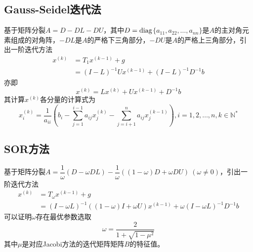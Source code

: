 \documentclass[UTF8,a4paper,10pt]{ctexart}
\begin{document}
        \subsection{Gauss-Seidel迭代法}
            \par
            基于矩阵分裂$A=D-DL-DU$，其中$D=\rm{diag}$$\{a_{11},a_{22},\dots,a_{nn}\}$是$A$的主对角元素组成的对角阵，$-DL$是$A$的严格下三角部分，$-DU$是$A$的严格上三角部分，引出一阶迭代方法
            \begin{align*}
                x^{(k)}&=T_1x^{(k-1)}+g \\
                &=(I-L)^{-1}Ux^{(k-1)}+(I-L)^{-1}D^{-1}b
            \end{align*}
            亦即
            $$
            x^{(k)}=Lx^{(k)}+Ux^{(k-1)}+D^{-1}b
            $$
            其计算$x^{(k)}$各分量的计算式为
            $$
            x^{(k)}_i=\dfrac{1}{a_{ii}}\left(b_i-\sum_{j=1}^{i-1}a_{ij}x^{(k)}_j-\sum_{j=i+1}^{n}a_{ij}x^{(k-1)}_j\right),i=1,2,\dots,n,k\in\mathbb{N^*}
            $$
        \subsection{SOR方法}
            \par
            基于矩阵分裂$A=\dfrac{1}{\omega}(D-\omega DL)-\dfrac{1}{\omega}((1-\omega)D+\omega DU)\ (\omega\neq 0)$，引出一阶迭代方法
            \begin{align*}
                x^{(k)}&=T_{\omega}x^{(k-1)}+g \\
                &=(I-\omega L)^{-1}((1-\omega)I+\omega U)x^{(k-1)}+\omega(I-\omega L)^{-1}D^{-1}b
            \end{align*}
            可以证明$\omega$存在最优参数选取
            $$
            \omega=\dfrac{2}{1+\sqrt{1-\mu^2}}
            $$
            其中$\mu$是对应Jacobi方法的迭代矩阵矩阵$B$的特征值。
\end{document}

